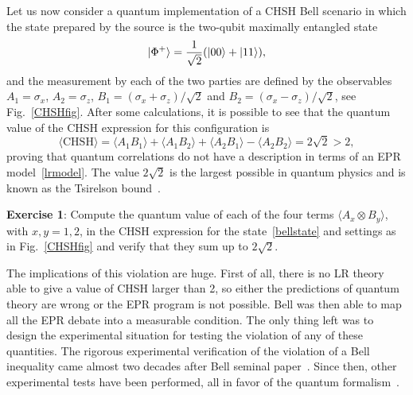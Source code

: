 \documentclass[a4paper]{article}
\def\sz{{\sigma_z}}
\def\sx{{\sigma_x}}
\begin{document}
Let us now consider a quantum implementation of a CHSH Bell scenario in which the state prepared by the source is the two-qubit maximally entangled state 
\begin{equation}
\label{bellstate}
    |\Phi^+\rangle=\frac{1}{\sqrt 2}(|00\rangle+|11\rangle) ,
\end{equation}
and the measurement by each of the two parties are defined by the observables $A_1=\sx$, $A_2=\sz$, $B_1=(\sx+\sz)/\sqrt 2$ and $B_2=(\sx-\sz)/\sqrt 2$, see Fig.~\ref{CHSHfig}. After some calculations, it is possible to see that the quantum value of the CHSH expression for this configuration is 
\begin{equation}\label{tsirelson}
    \langle \text{CHSH}\rangle =\langle A_1B_1\rangle +\langle A_1B_2\rangle +\langle A_2B_1\rangle -\langle A_2B_2\rangle =2\sqrt 2 > 2,
\end{equation}
proving that quantum correlations do not have a description in terms of an EPR model~\eqref{lrmodel}. The value $2\sqrt 2$ is the largest possible in quantum physics and is known as the Tsirelson bound~\cite{tsirelson}.

\textbf{Exercise 1}: Compute the quantum value of each of the four terms $\langle A_x\otimes B_y\rangle$, with $x,y=1,2$, in the CHSH expression for the state~\eqref{bellstate} and settings as in Fig.~\ref{CHSHfig} and verify that they sum up to $2\sqrt 2$.



The implications of this violation are huge. First of all, there is no LR
theory able to give a value of CHSH larger than 2, so either the predictions of quantum theory are wrong or the EPR program is not possible. Bell was then able to
map all the EPR debate into a measurable condition. The only thing
left was to design the experimental situation for testing the
violation of any of these quantities. The rigorous experimental
verification of the violation of a Bell inequality came almost two
decades after Bell seminal paper~\cite{Aspect}. Since then, other
experimental tests have been performed, all in favor of the
quantum formalism~\cite{hanson,nist,vienna}.
\end{document}
